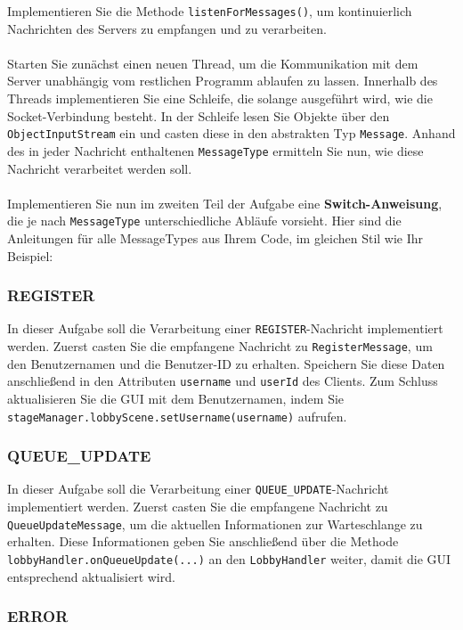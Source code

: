 \documentclass[12pt]{article}
\begin{document}
Implementieren Sie die Methode \texttt{listenForMessages()}, um kontinuierlich Nachrichten des Servers zu empfangen und zu verarbeiten.
\\ \\
Starten Sie zunächst einen neuen Thread, um die Kommunikation mit dem Server unabhängig vom restlichen Programm ablaufen zu lassen. 
Innerhalb des Threads implementieren Sie eine Schleife, die solange ausgeführt wird, wie die Socket-Verbindung besteht. 
In der Schleife lesen Sie Objekte über den \texttt{ObjectInputStream} ein und casten diese in den abstrakten Typ \texttt{Message}. 
Anhand des in jeder Nachricht enthaltenen \texttt{MessageType} ermitteln Sie nun, wie diese Nachricht verarbeitet werden soll.
\\ \\
Implementieren Sie nun im zweiten Teil der Aufgabe eine \textbf{Switch-Anweisung}, 
die je nach \texttt{MessageType} unterschiedliche Abläufe vorsieht. 
Hier sind die Anleitungen für alle MessageTypes aus Ihrem Code, im gleichen Stil wie Ihr Beispiel:

\subsubsection*{REGISTER}

In dieser Aufgabe soll die Verarbeitung einer \texttt{REGISTER}-Nachricht implementiert werden. 
Zuerst casten Sie die empfangene Nachricht zu \texttt{RegisterMessage}, 
um den Benutzernamen und die Benutzer-ID zu erhalten. 
Speichern Sie diese Daten anschließend in den Attributen \texttt{username} und \texttt{userId} des Clients. 
Zum Schluss aktualisieren Sie die GUI mit dem Benutzernamen, 
indem Sie \texttt{stageManager.lobbyScene.setUsername(username)} aufrufen.

\subsubsection*{QUEUE\_UPDATE}

In dieser Aufgabe soll die Verarbeitung einer \texttt{QUEUE\_UPDATE}-Nachricht implementiert werden. 
Zuerst casten Sie die empfangene Nachricht zu \texttt{QueueUpdateMessage}, 
um die aktuellen Informationen zur Warteschlange zu erhalten. 
Diese Informationen geben Sie anschließend über die Methode \texttt{lobbyHandler.onQueueUpdate(...)} an den \texttt{LobbyHandler} weiter, 
damit die GUI entsprechend aktualisiert wird.

\subsubsection*{ERROR}
\end{document}
